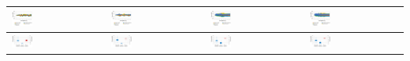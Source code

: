 \begin{table}[b]
\begin{tabularx}{\textwidth}{|Y|Y|Y|Y|}
		\includegraphics[width=0.23\textwidth, trim=0 0 0 -3]{../gfx/data/E1_001.png} &
		\includegraphics[width=0.23\textwidth, trim=0 0 0 -3]{../gfx/data/E2_001.png} &
		\includegraphics[width=0.23\textwidth, trim=0 0 0 -3]{../gfx/data/E3_001.png} &
		\includegraphics[width=0.23\textwidth, trim=0 0 0 -3]{../gfx/data/E4_001.png} \\
		
		\hline
		
		\includegraphics[width=0.23\textwidth, trim=0 0 0 -3]{../gfx/data/E1_002.png} &
		\includegraphics[width=0.23\textwidth, trim=0 0 0 -3]{../gfx/data/E2_002.png} &
		\includegraphics[width=0.23\textwidth, trim=0 0 0 -3]{../gfx/data/E3_002.png} &
		\includegraphics[width=0.23\textwidth, trim=0 0 0 -3]{../gfx/data/E4_002.png} \\
		

\end{tabularx}
\end{table}
